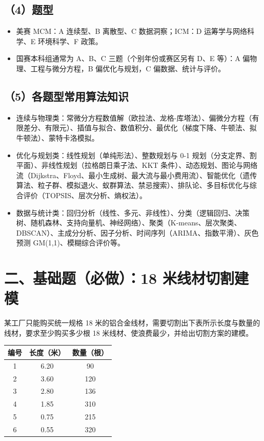 \documentclass[12pt,a4paper]{ctexart}
\begin{document}
\subsection{（4）题型}
\begin{itemize}
  \item 美赛 MCM：A 连续型、B 离散型、C 数据洞察；ICM：D 运筹学与网络科学、E 环境科学、F 政策。
  \item 国赛本科组通常为 A、B、C 三题（个别年份或赛区另有 D、E 等）：A 偏物理、工程与微分方程，B 偏优化与规划，C 偏数据、统计与评价。
\end{itemize}

\subsection{（5）各题型常用算法知识}
\begin{itemize}
  \item 连续与物理类：常微分方程数值解（欧拉法、龙格-库塔法）、偏微分方程（有限差分、有限元）、插值与拟合、数值积分、最优化（梯度下降、牛顿法、拟牛顿法）、蒙特卡洛模拟。
  \item 优化与规划类：线性规划（单纯形法）、整数规划与 0-1 规划（分支定界、割平面）、非线性规划（拉格朗日乘子法、KKT 条件）、动态规划、图论与网络流（Dijkstra、Floyd、最小生成树、最大流与最小费用流）、智能优化（遗传算法、粒子群、模拟退火、蚁群算法、禁忌搜索）、排队论、多目标优化与综合评价（TOPSIS、层次分析、熵权法）。
  \item 数据与统计类：回归分析（线性、多元、非线性）、分类（逻辑回归、决策树、随机森林、支持向量机、神经网络）、聚类（K-means、层次聚类、DBSCAN）、主成分分析、因子分析、时间序列（ARIMA、指数平滑）、灰色预测 GM(1,1)、模糊综合评价等。
\end{itemize}

\section{二、基础题（必做）：18 米线材切割建模}

某工厂只能购买统一规格 18 米的铝合金线材，需要切割出下表所示长度与数量的线材，要求至少购买多少根 18 米线材、使浪费最少，并给出切割方案的建模。

\begin{table}[H]
\centering
\begin{tabular}{ccc}
\toprule
编号 & 长度（米） & 数量（根） \\
\midrule
1 & 6.20 & 90 \\
2 & 3.60 & 120 \\
3 & 2.80 & 136 \\
4 & 1.85 & 310 \\
5 & 0.75 & 215 \\
6 & 0.55 & 320 \\
\bottomrule
\end{tabular}
\end{table}
\end{document}
